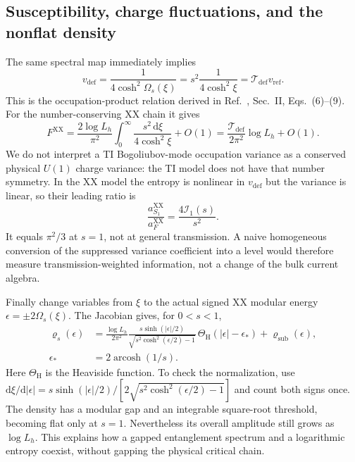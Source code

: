 \documentclass[aps,prb,onecolumn,nofootinbib,superscriptaddress]{revtex4-2}
\newcommand{\dd}{\mathrm{d}}
\begin{document}
\subsection{Susceptibility, charge fluctuations, and the nonflat density}
The same spectral map immediately implies
\begin{equation}
 v_{\mathrm{def}}=\frac{1}{4\cosh^2\Omega_s(\xi)}
       =s^2\frac{1}{4\cosh^2\xi}
       =\mathcal T_{\mathrm{def}}v_{\mathrm{ref}}.
 \label{eq:defect-susceptibility}
\end{equation}
This is the occupation-product relation derived in
Ref.~\cite{PeschelEisler2012}, Sec.~II, Eqs.~(6)--(9).
For the number-conserving XX chain it gives
\begin{equation}
 F^{\mathrm{XX}}=
 \frac{2\log L_h}{\pi^2}\int_0^\infty
                   \frac{s^2\,\dd\xi}{4\cosh^2\xi}+O(1)
 =\frac{\mathcal T_{\mathrm{def}}}{2\pi^2}\log L_h+O(1).
 \label{eq:defect-charge}
\end{equation}
We do not interpret a TI Bogoliubov-mode occupation variance as a
conserved physical $U(1)$ charge variance: the TI model does not have
that number symmetry. In the XX model the entropy is nonlinear in
$v_{\mathrm{def}}$ but the variance is linear, so their leading ratio is
\begin{equation}
 \frac{a_{S_1}^{\mathrm{XX}}}{a_F^{\mathrm{XX}}}
   =\frac{4\mathcal I_1(s)}{s^2}.
 \label{eq:defect-ratio}
\end{equation}
It equals $\pi^2/3$ at $s=1$, not at general transmission. A naive
homogeneous conversion of the suppressed variance coefficient into
a level would therefore measure transmission-weighted information,
not a change of the bulk current algebra.

Finally change variables from $\xi$ to the actual signed XX modular
energy $\epsilon=\pm2\Omega_s(\xi)$. The Jacobian gives, for $0<s<1$,
\begin{align}
 \varrho_s(\epsilon)
 &=\frac{\log L_h}{2\pi^2}
   \frac{s\sinh(|\epsilon|/2)}
        {\sqrt{s^2\cosh^2(\epsilon/2)-1}}\,
   \Theta_{\mathrm H}(|\epsilon|-\epsilon_*)+
      \varrho_{\mathrm{sub}}(\epsilon),\nonumber\\
 \epsilon_*&=2\operatorname{arcosh}(1/s).
 \label{eq:defect-density}
\end{align}
Here $\Theta_{\mathrm H}$ is the Heaviside function. To check the
normalization, use
$\dd\xi/\dd|\epsilon|
=s\sinh(|\epsilon|/2)/[2\sqrt{s^2\cosh^2(\epsilon/2)-1}]$
and count both signs once. The density has a modular gap and an
integrable square-root threshold, becoming flat only at $s=1$.
Nevertheless its overall amplitude still grows as $\log L_h$.
This explains how a gapped entanglement spectrum and a logarithmic
entropy coexist, without gapping the physical critical chain.
\end{document}
